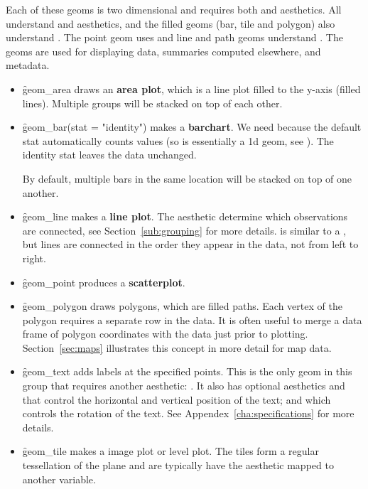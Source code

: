 Each of these geoms is two dimensional and requires both  and  aesthetics.  All understand  and  aesthetics, and the filled geoms (bar, tile and polygon) also understand .  The point geom uses  and line and path geoms understand . The geoms are used for displaying data, summaries computed elsewhere, and metadata.

\begin{itemize}
  \item \f{geom_area} draws an \textbf{area plot}, which is a line plot filled to the y-axis (filled lines).  Multiple groups will be stacked on top of each other.
  
  \item \f{geom_bar(stat = "identity")} makes a \textbf{barchart}. We need  because the default stat automatically counts values (so is essentially a 1d geom, see ). The identity stat leaves the data unchanged.  
  
  By default, multiple bars in the same location will be stacked on top of one another.
  
  \item \f{geom_line} makes a \textbf{line plot}.  The  aesthetic determine which observations are connected, see Section~\ref{sub:grouping} for more details.  is similar to a , but lines are connected in the order they appear in the data, not from left to right.  
  
  \item \f{geom_point} produces a \textbf{scatterplot}.
  
  \item \f{geom_polygon} draws polygons, which are filled paths.  Each vertex of the polygon requires a separate row in the data.  It is often useful to merge a data frame of polygon coordinates with the data just prior to plotting.  Section~\ref{sec:maps} illustrates this concept in more detail for map data.
  
  \item \f{geom_text} adds labels at the specified points.  This is the only geom in this group that requires another aesthetic: .  It also has optional aesthetics  and  that control the horizontal and vertical position of the text; and  which controls the rotation of the text.  See Appendex~\ref{cha:specifications} for more details.
  
  \item \f{geom_tile} makes a image plot or level plot.  The tiles form a regular tessellation of the plane and are typically have the  aesthetic mapped to another variable.

\end{itemize}

